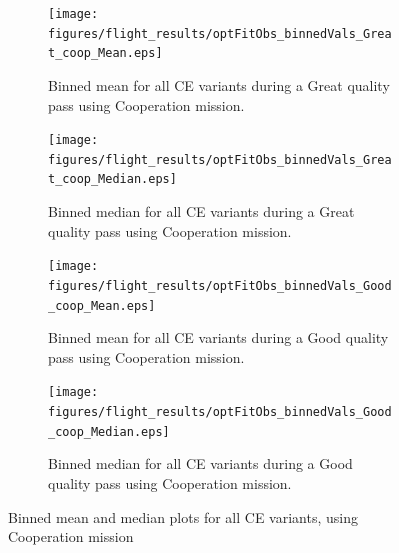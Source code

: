 \begin{figure}[ht]
\begin{subfigure}{0.48\linewidth}
\centering
\texttt{[image: figures/flight\_results/optFitObs\_binnedVals\_Great\_coop\_Mean.eps]}
\caption{Binned mean for all CE variants during a Great quality pass using Cooperation mission.}
\label{fig:flightCoopGreatMean}
\end{subfigure}\hfill%
\begin{subfigure}{0.48\linewidth}
\centering
\texttt{[image: figures/flight\_results/optFitObs\_binnedVals\_Great\_coop\_Median.eps]}
\caption{Binned median for all CE variants during a Great quality pass using Cooperation mission.}
\label{fig:flightCoopGreatMed}
\end{subfigure}

\begin{subfigure}{0.48\linewidth}
\centering
\texttt{[image: figures/flight\_results/optFitObs\_binnedVals\_Good\_coop\_Mean.eps]}
\caption{Binned mean for all CE variants during a Good quality pass using Cooperation mission.}
\label{fig:flightCoopGoodMean}
\end{subfigure}\hfill%
\begin{subfigure}{0.48\linewidth}
\centering
\texttt{[image: figures/flight\_results/optFitObs\_binnedVals\_Good\_coop\_Median.eps]}
\caption{Binned median for all CE variants during a Good quality pass using Cooperation mission.}
\label{fig:flightCoopGoodMed}
\end{subfigure}

\caption{Binned mean and median plots for all CE variants, using Cooperation mission}
\label{fig:flightCoopMeanMed}
\end{figure}

